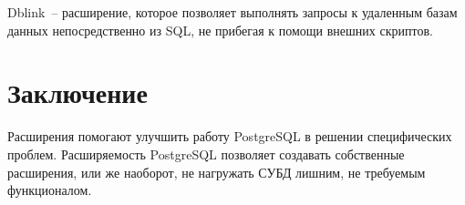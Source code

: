 Dblink~-- расширение, которое позволяет выполнять запросы к удаленным базам данных непосредственно из SQL, не прибегая к помощи внешних скриптов.

\section{Заключение}

Расширения помогают улучшить работу PostgreSQL в решении специфических проблем. Расширяемость PostgreSQL позволяет создавать собственные расширения, или же наоборот, не нагружать СУБД лишним, не требуемым функционалом.